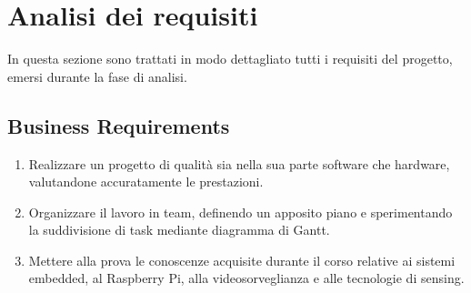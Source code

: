 \documentclass[12pt]{article}
\begin{document}
\newpage



\section{Analisi dei requisiti}
\label{sec:requisiti}

In questa sezione sono trattati in modo dettagliato tutti i requisiti del progetto, emersi durante la fase di analisi.

\subsection{Business Requirements}
\begin{enumerate}
	\item Realizzare un progetto di qualità sia nella sua parte software che hardware, valutandone accuratamente le prestazioni.
	\item Organizzare il lavoro in team, definendo un apposito piano e sperimentando la suddivisione di task mediante diagramma di Gantt.
	\item Mettere alla prova le conoscenze acquisite durante il corso relative ai sistemi embedded, al Raspberry Pi, alla videosorveglianza e alle tecnologie di sensing.
\end{enumerate}
\end{document}
